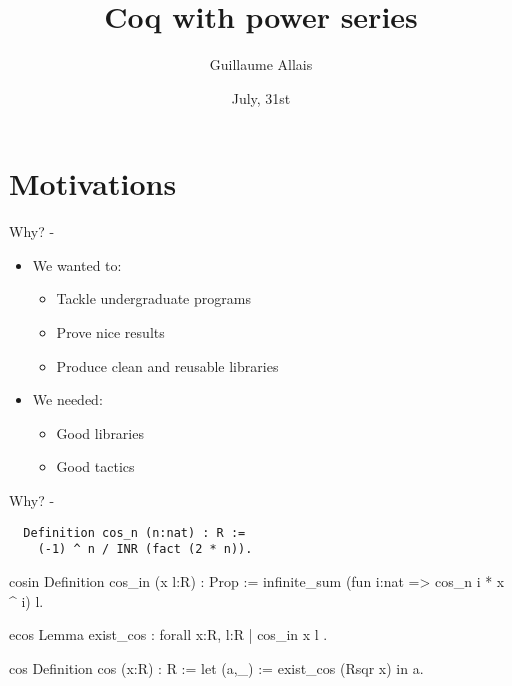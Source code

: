 \documentclass{beamer}
\author{Guillaume Allais}
\title{Coq with power series}
\institute{\coqtail{} Junior Laboratory\\
	ENS Lyon}
\date{July, 31st}
\begin{document}
\begin{frame}[t,plain]
\titlepage
\end{frame}

\begin{frame}
\tableofcontents
\end{frame}

\section{Motivations}

\begin{frame}{Why? - \coqtail{}}
\begin{itemize}
 \item We wanted to:
   \begin{itemize}
     \item Tackle undergraduate programs
     \item Prove nice results
     \item Produce clean and reusable libraries
   \end{itemize}
   \bigskip
 \item We needed:
   \begin{itemize}
     \item Good libraries 
     \item Good tactics
   \end{itemize}
\end{itemize}
\end{frame}

\begin{frame}[fragile,t]{Why? - \rpser{}}
\begin{verbatim}
  Definition cos_n (n:nat) : R :=
    (-1) ^ n / INR (fact (2 * n)).
\end{verbatim}
\begin{SaveVerbatim}{cosin}
  Definition cos_in (x l:R) : Prop :=
    infinite_sum (fun i:nat => cos_n i * x ^ i) l.
\end{SaveVerbatim}

\begin{SaveVerbatim}{ecos}
  Lemma exist_cos : forall x:R, { l:R | cos_in x l }.
\end{SaveVerbatim}

\begin{SaveVerbatim}{cos}
  Definition cos (x:R) : R := let (a,_) :=
    exist_cos (Rsqr x) in a.
\end{SaveVerbatim}

{
\bigskip
\color{red}{But $\cos$ is much more than just a series!}
}
\end{frame}
\end{document}
